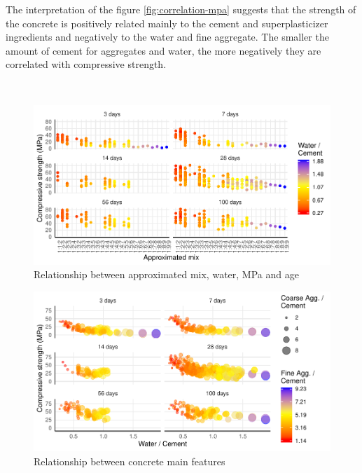 \documentclass[
]{article}
\begin{document}
The interpretation of the figure \ref{fig:correlation-mpa} suggests that
the strength of the concrete is positively related mainly to the cement
and superplasticizer ingredients and negatively to the water and fine
aggregate. The smaller the amount of cement for aggregates and water,
the more negatively they are correlated with compressive strength.

~

\begin{figure}

{\centering \includegraphics{paper_EN_files/figure-latex/mix-app-mpa-1} 

}

\caption{Relationship between approximated mix, water, MPa and age}\label{fig:mix-app-mpa}
\end{figure}

\begin{figure}

{\centering \includegraphics{paper_EN_files/figure-latex/mix-mpa-1} 

}

\caption{Relationship between concrete main features}\label{fig:mix-mpa}
\end{figure}
\end{document}
